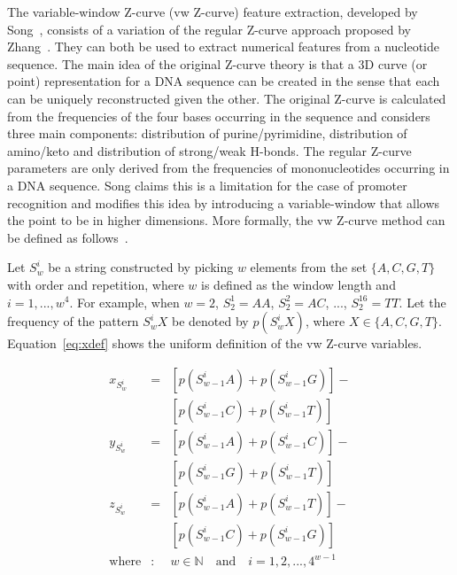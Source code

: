 \documentclass[conference]{IEEEtran}
\begin{document}
The variable-window Z-curve (vw Z-curve) feature extraction, developed by Song~\cite{song2011a}, consists of a variation of the regular Z-curve approach proposed by Zhang~\cite{zhang1997}. They can both be used to extract numerical features from a nucleotide sequence. The main idea of the original Z-curve theory is that a 3D curve (or point) representation for a DNA sequence can be created in the sense that each can be uniquely reconstructed given the other. The original Z-curve is calculated from the frequencies of the four bases occurring in the sequence and considers three main components: distribution of purine/pyrimidine, distribution of amino/keto and distribution of strong/weak H-bonds. The regular Z-curve parameters are only derived from the frequencies of mononucleotides occurring in a DNA sequence. Song claims this is a limitation for the case of promoter recognition and modifies this idea by introducing a variable-window that allows the point to be in higher dimensions. More formally, the vw Z-curve method can be defined as follows~\cite{song2011a}.

Let $ S_{w}^{i} $ be a string constructed by picking $ w $ elements from the set $ \{A,C,G,T\} $ with order and repetition, where $ w $ is defined as the window length and $ i = 1, ..., w^{4} $. For example, when $ w = 2 $, $ S_{2}^{1} = AA $, $ S_{2}^{2} = AC $, ..., $ S_{2}^{16} = TT $. Let the frequency of the pattern $ S_{w}^{i}X $ be denoted by $ p\left(S_{w}^{i}X\right) $, where $ X \in \{A,C,G,T\} $. Equation~\ref{eq:xdef} shows the uniform definition of the vw Z-curve variables.

\begin{equation}
    \begin{array}{lcl}
        x_{S_{w}^{i}} & = & [p\left(S_{w-1}^{i}A\right) + p\left(S_{w-1}^{i}G\right)] - \\
                      &   & [p\left(S_{w-1}^{i}C\right) + p\left(S_{w-1}^{i}T\right)] \\[0.3cm]
        y_{S_{w}^{i}} & = & [p\left(S_{w-1}^{i}A\right) + p\left(S_{w-1}^{i}C\right)] - \\
                      &   & [p\left(S_{w-1}^{i}G\right) + p\left(S_{w-1}^{i}T\right)] \\[0.3cm]
        z_{S_{w}^{i}} & = & [p\left(S_{w-1}^{i}A\right) + p\left(S_{w-1}^{i}T\right)] - \\
                      &   & [p\left(S_{w-1}^{i}C\right) + p\left(S_{w-1}^{i}G\right)] \\[0.3cm]
        \text{where}  & : & w \in \mathbb{N} \quad \text{and} \quad i = 1, 2, ..., 4^{w-1} \\
    \end{array} 
    \label{eq:xdef}
\end{equation}
\end{document}
